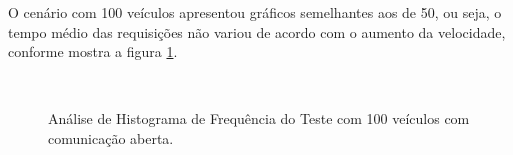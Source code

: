 \documentclass[
	12pt,				%
	oneside,			%
	a4paper,			%
	english,			%
	brazil				%
	]{abntex2ppgsi}
\begin{document}
O cenário com 100 veículos apresentou gráficos semelhantes aos de 50, ou seja, o tempo médio das requisições não variou de acordo com o aumento da velocidade, conforme mostra a figura \ref{fig:imgHistFreq100}.

\begin{figure}[h!]
	\caption{Análise de Histograma de Frequência do Teste  com 100 veículos com comunicação aberta.}
	\centering
	\label{fig:imgHistFreq100}
	\\
\end{figure}
\end{document}
